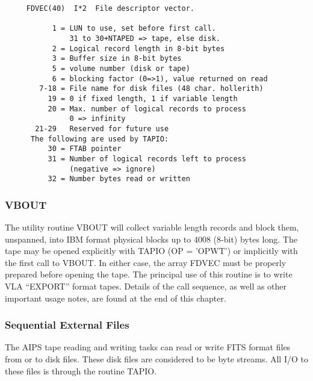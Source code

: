 \begin{verbatim}
     FDVEC(40)  I*2  File descriptor vector.

           1 = LUN to use, set before first call.
               31 to 30+NTAPED => tape, else disk.
           2 = Logical record length in 8-bit bytes
           3 = Buffer size in 8-bit bytes
           5 = volume number (disk or tape)
           6 = blocking factor (0=>1), value returned on read
        7-18 = File name for disk files (48 char. hollerith)
          19 = 0 if fixed length, 1 if variable length
          20 = Max. number of logical records to process
               0 => infinity
       21-29   Reserved for future use
      The following are used by TAPIO:
          30 = FTAB pointer
          31 = Number of logical records left to process
               (negative => ignore)
          32 = Number bytes read or written
\end{verbatim}

\subsubsection{VBOUT}
The utility routine VBOUT will collect variable length records and
block them, unspanned, into IBM format physical blocks up to 4008
(8-bit) bytes long. The tape may be opened explicitly with TAPIO (OP =
'OPWT') or implicitly with the first call to VBOUT.  In either case,
the array FDVEC must be properly prepared before opening the tape.
The principal use of this routine is to write VLA ``EXPORT'' format
tapes.  Details of the call sequence, as well as other important
usage notes, are found at the end of this chapter.


\subsubsection{Sequential External Files}
The AIPS tape reading and writing tasks can read or write FITS format
files from or to disk files.  These disk files are considered to be
byte streams.  All I/O to these files is through the routine
TAPIO.


